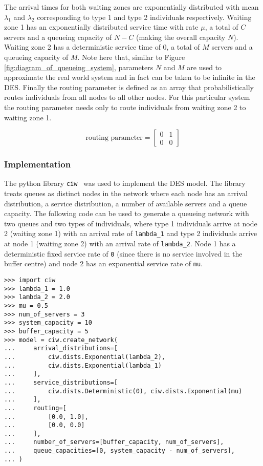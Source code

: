 The arrival times for both waiting zones are exponentially distributed with
mean \(\lambda_1\) and \(\lambda_2\) corresponding to type 1 and type 2
individuals respectively.
Waiting zone 1 has an exponentially distributed service time with rate \(\mu\),
a total of \(C\) servers and a queueing capacity of \(N - C\) (making the
overall capacity \(N\)). 
Waiting zone 2 has a deterministic service time of \(0\), a total of \(M\)
servers and a queueing capacity of \(M\).
Note here that, similar to Figure \ref{fig:diagram_of_queueing_system},
parameters \(N\) and \(M\) are used to approximate the real world system 
and in fact can be taken to be infinite in the DES.
Finally the routing parameter is defined as an array that probabilistically
routes individuals from all nodes to all other nodes.
For this particular system the routing parameter needs only to route individuals
from waiting zone 2 to waiting zone 1.

\begin{equation}
    \text{routing parameter} = \left[
    \begin{array}{cc}
        0 & 1 \\
        0 & 0
    \end{array}
    \right]
\end{equation}


\subsubsection{Implementation}
The python library \lstinline[style=pystyle]{ciw}~\cite{ciwpython, ciwarticle}
was used to implement the DES model.
The library treats queues as distinct nodes in the network where each node has
an arrival distribution, a service distribution, a number of available servers
and a queue capacity.
The following code can be used to generate a queueing network with two
queues and two types of individuals, where type 1 individuals arrive at node
2 (waiting zone 1) with an arrival rate of \lstinline[style=pystyle]{lambda_1}
and type 2 individuals arrive at node 1 (waiting zone 2) with an arrival rate of
\lstinline[style=pystyle]{lambda_2}.
Node 1 has a deterministic fixed service rate of \lstinline[style=pystyle]{0}
(since there is no service involved in the buffer centre) and node 2 has an
exponential service rate of \lstinline[style=pystyle]{mu}.

\begin{lstlisting}[style=pystyle]
>>> import ciw
>>> lambda_1 = 1.0
>>> lambda_2 = 2.0
>>> mu = 0.5
>>> num_of_servers = 3
>>> system_capacity = 10
>>> buffer_capacity = 5
>>> model = ciw.create_network(
...     arrival_distributions=[
...         ciw.dists.Exponential(lambda_2),
...         ciw.dists.Exponential(lambda_1)
...     ],
...     service_distributions=[
...         ciw.dists.Deterministic(0), ciw.dists.Exponential(mu)
...     ],
...     routing=[
...         [0.0, 1.0],
...         [0.0, 0.0]
...     ],
...     number_of_servers=[buffer_capacity, num_of_servers],
...     queue_capacities=[0, system_capacity - num_of_servers],
... )

\end{lstlisting}

